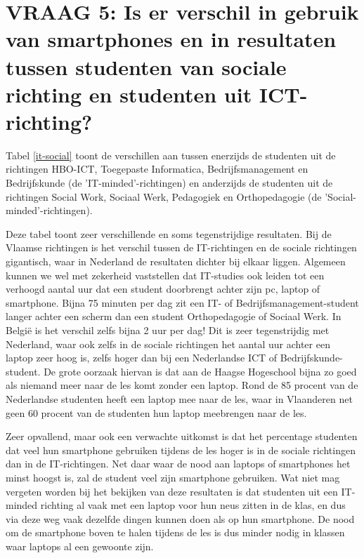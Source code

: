 \section{VRAAG 5: Is er verschil in gebruik van smartphones en in resultaten tussen studenten van sociale richting en studenten uit ICT-richting?}
\label{sec:sociale-it-richting}

Tabel \ref{it-social} toont de verschillen aan tussen enerzijds de studenten uit de richtingen HBO-ICT, Toegepaste Informatica, Bedrijfsmanagement en Bedrijfskunde (de 'IT-minded'-richtingen) en anderzijds de studenten uit de richtingen Social Work, Sociaal Werk, Pedagogiek en Orthopedagogie (de 'Social-minded'-richtingen).

Deze tabel toont zeer verschillende en soms tegenstrijdige resultaten. Bij de Vlaamse richtingen is het verschil tussen de IT-richtingen en de sociale richtingen gigantisch, waar in Nederland de resultaten dichter bij elkaar liggen. Algemeen kunnen we wel met zekerheid vaststellen dat IT-studies ook leiden tot een verhoogd aantal uur dat een student doorbrengt achter zijn pc, laptop of smartphone. Bijna 75 minuten per dag zit een IT- of Bedrijfsmanagement-student langer achter een scherm dan een student Orthopedagogie of Sociaal Werk. In België is het verschil zelfs bijna 2 uur per dag! Dit is zeer tegenstrijdig met Nederland, waar ook zelfs in de sociale richtingen het aantal uur achter een laptop zeer hoog is, zelfs hoger dan bij een Nederlandse ICT of Bedrijfskunde-student. De grote oorzaak hiervan is dat aan de Haagse Hogeschool bijna zo goed als niemand meer naar de les komt zonder een laptop. Rond de 85 procent van de Nederlandse studenten heeft een laptop mee naar de les, waar in Vlaanderen net geen 60 procent van de studenten hun laptop meebrengen naar de les.

Zeer opvallend, maar ook een verwachte uitkomst is dat het percentage studenten dat veel hun smartphone gebruiken tijdens de les hoger is in de sociale richtingen dan in de IT-richtingen. Net daar waar de nood aan laptops of smartphones het minst hoogst is, zal de student veel zijn smartphone gebruiken. Wat niet mag vergeten worden bij het bekijken van deze resultaten is dat studenten uit een IT-minded richting al vaak met een laptop voor hun neus zitten in de klas, en dus via deze weg vaak dezelfde dingen kunnen doen als op hun smartphone. De nood om de smartphone boven te halen tijdens de les is dus minder nodig in klassen waar laptops al een gewoonte zijn.

